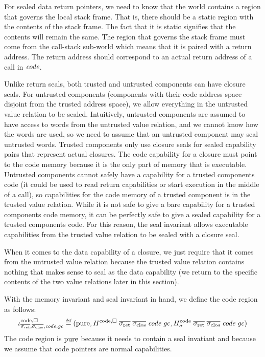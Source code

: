 \begin{jversion}
For sealed data return pointers, we need to know that the world contains a region that governs the local stack frame.
That is, there should be a static region with the contents of the stack frame.
The fact that it is static signifies that the contents will remain the same.
The region that governs the stack frame must come from the call-stack sub-world which means that it is paired with a return address.
The return address should correspond to an actual return address of a call in $\mathit{code}$.

Unlike return seals, both trusted and untrusted components can have closure seals.
For untrusted components (components with their code address space disjoint from the trusted address space), we allow everything in the untrusted value relation to be sealed.
Intuitively, untrusted components are assumed to have access to words from the untrusted value relation, and we cannot know how the words are used, so we need to assume that an untrusted component may seal untrusted words.
Trusted components only use closure seals for sealed capability pairs that represent actual closures.
The code capability for a closure must point to the code memory because it is the only part of memory that is executable.
Untrusted components cannot safely have a capability for a trusted components code (it could be used to read return capabilities or start execution in the middle of a call), so capabilities for the code memory of a trusted component is in the trusted value relation.
While it is not safe to give a bare capability for a trusted components code memory, it can be perfectly safe to give a sealed capability for a trusted components code.
For this reason, the seal invariant allows executable capabilities from the trusted value relation to be sealed with a closure seal.

When it comes to the data capability of a closure, we just require that it comes from the untrusted value relation because the trusted value relation contains nothing that makes sense to seal as the data capability (we return to the specific contents of the two value relations later in this section).

With the memory invariant and seal invariant in hand, we define the code region as follows:
\[
  \codereg{\sigrets,\sigcloss,\code,\gc} \defeq (\pure, H^\mathrm{code,\square} \; \sigrets \; \sigcloss \; \code \; \gc, H^\mathrm{code}_\sigma \; \sigrets \; \sigcloss \; \code \; \gc)
\]
The code region is $\mathrm{pure}$ because it needs to contain a seal invatiant and because we assume that code pointers are normal capabilities.


\end{jversion}
